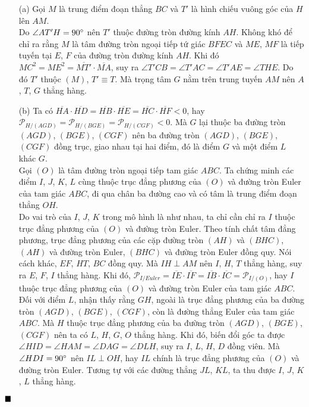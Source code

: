 \documentclass{article} %
\newenvironment{solution}[1][Lời giải]{%
  \proof[\faPenNib \hspace{0.2cm} \ttfamily \scshape \large #1]%
}{\(\hfill \blacksquare\){\parfillskip0pt\par}}
\begin{document}
        \begin{solution}
            \hfill
            \begin{enumerate}
                \item[(a)] Gọi \(M\) là trung điểm đoạn thẳng \(BC\) và \(T'\) là hình chiếu vuông góc của \(H\) lên \(AM\).\\
                Do \(\angle AT'H = 90 \degree\) nên \(T'\) thuộc đường tròn đường kính \(AH\). Không khó để chỉ ra rằng \(M\) là tâm đường tròn ngoại tiếp tứ giác \(BFEC\) và \(ME\), \(MF\) là tiếp tuyến tại \(E\), \(F\) của đường tròn đường kính \(AH\). Khi đó \(MC^2 = ME^2 = \overline{MT'} \cdot \overline{MA}\), suy ra \(\angle T'CB = \angle T'AC = \angle T'AE = \angle THE\). Do đó \(T'\) thuộc \((M)\), \(T' \equiv T\). Mà trọng tâm \(G\) nằm trên trung tuyến \(AM\) nên \(A\), \(T\), \(G\) thẳng hàng.
                \item[(b)] Ta có \(\overline{HA} \cdot \overline{HD} = \overline{HB} \cdot \overline{HE} = \overline{HC} \cdot \overline{HF} < 0\), hay \(\mathcal{P}_{H/(AGD)} = \mathcal{P}_{H/(BGE)} = \mathcal{P}_{H/(CGF)} < 0\). Mà \(G\) lại thuộc ba đường tròn \((AGD)\), \((BGE)\), \((CGF)\) nên ba đường tròn \((AGD)\), \((BGE)\), \((CGF)\) đồng trục, giao nhau tại hai điểm, đó là điểm \(G\) và một điểm \(L\) khác \(G\).\\
                Gọi \((O)\) là tâm đường tròn ngoại tiếp tam giác \(ABC\). Ta chứng minh các điểm \(I\), \(J\), \(K\), \(L\) cùng thuộc trục đẳng phương của \((O)\) và đường tròn Euler của tam giác \(ABC\), đi qua chân ba đường cao và có tâm là trung điểm đoạn thẳng \(OH\).\\
                Do vai trò của \(I\), \(J\), \(K\) trong mô hình là như nhau, ta chỉ cần chỉ ra \(I\) thuộc trục đẳng phương của \((O)\) và đường tròn Euler. Theo tính chất tâm đẳng phương, trục đẳng phương của các cặp đường tròn \((AH)\) và \((BHC)\), \((AH)\) và đường tròn Euler, \((BHC)\) và đường tròn Euler đồng quy. Nói cách khác, \(EF\), \(HT\), \(BC\) đồng quy. Mà \(IH \perp AM\) nên \(I\), \(H\), \(T\) thẳng hàng, suy ra \(E\), \(F\), \(I\) thẳng hàng. Khi đó, \(\mathcal{P}_{I/Euler} = \overline{IE} \cdot \overline{IF} = \overline{IB} \cdot \overline{IC} = \mathcal{P}_{I/(O)}\), hay \(I\) thuộc trục đẳng phương của \((O)\) và đường tròn Euler của tam giác \(ABC\).\\
                Đối với điểm \(L\), nhận thấy rằng \(GH\), ngoài là trục đẳng phương của ba đường tròn \((AGD)\), \((BGE)\), \((CGF)\), còn là đường thẳng Euler của tam giác \(ABC\). Mà \(H\) thuộc trục đẳng phương của ba đường tròn \((AGD)\), \((BGE)\), \((CGF)\) nên ta có \(L\), \(H\), \(G\), \(O\) thẳng hàng. Khi đó, biến đổi góc ta được \(\angle HID = \angle HAM = \angle DAG = \angle DLH\), suy ra \(I\), \(L\), \(H\), \(D\) đồng viên. Mà \(\angle HDI = 90 \degree\) nên \(IL \perp OH\), hay \(IL\) chính là trục đẳng phương của \((O)\) và đường tròn Euler. Tương tự với các đường thẳng \(JL\), \(KL\), ta thu được \(I\), \(J\), \(K\), \(L\) thẳng hàng.
            \end{enumerate}
        \end{solution}
\end{document}
